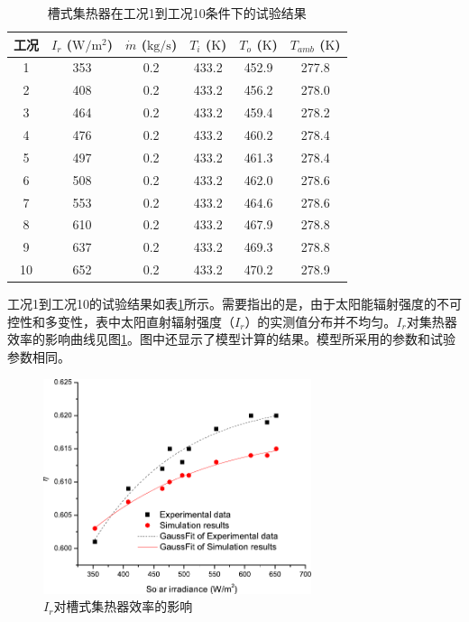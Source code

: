 \begin{table}[htbp]\footnotesize
	\caption{槽式集热器在工况1到工况10条件下的试验结果}
	\begin{center}
	\begin{tabular}{cccccc}
		\toprule
		工况	& $I_r$ ($\mathrm{W/m^2}$)	&	$\dot{m}$ ($\mathrm{kg/s}$)			&	$T_i$ ($\mathrm{K}$)	&	$T_o$ ($\mathrm{K}$)		&	$T_{amb}$ ($\mathrm{K}$)\\
		\midrule
		1	&	353	&	0.2	&	433.2	&	452.9	&	277.8\\
		2	&	408	&	0.2	&	433.2	&	456.2	&	278.0\\
		3	&	464	&	0.2	&	433.2	&	459.4	&	278.2\\
		4	&	476	&	0.2	&	433.2	&	460.2	&	278.4\\
		5	&	497	&	0.2	&	433.2	&	461.3	&	278.4\\
		6	&	508	&	0.2	&	433.2	&	462.0	&	278.6\\
		7	&	553	&	0.2	&	433.2	&	464.6	&	278.6\\
		8	&	610	&	0.2	&	433.2	&	467.9	&	278.8\\
		9	&	637	&	0.2	&	433.2	&	469.3	&	278.8\\
		10	&	652	&	0.2	&	433.2	&	470.2	&	278.9\\
		\bottomrule
	\end{tabular}
	\end{center}
	\label{tab:ResultOfTrough1}
\end{table}
工况1到工况10的试验结果如表\ref{tab:ResultOfTrough1}所示。需要指出的是，由于太阳能辐射强度的不可控性和多变性，表中太阳直射辐射强度（$I_r$）的实测值分布并不均匀。$I_r$对集热器效率的影响曲线见图\ref{fig:I_r-eta-trough}。图中还显示了模型计算的结果。模型所采用的参数和试验参数相同。
\begin{figure}[!ht]
\centering
\includegraphics[width=0.7\textwidth]{fig/I_r-eta-trough}
\caption{$I_r$对槽式集热器效率的影响}
\label{fig:I_r-eta-trough}
\end{figure}

